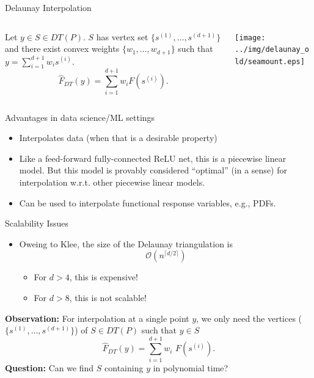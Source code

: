 \documentclass[aspectratio=169]{beamer}
\begin{document}
\begin{frame}{Delaunay Interpolation}
\begin{columns}
\begin{column}{.58\textwidth}
Let $y \in S \in DT(P)$.
$S$ has vertex set $\{s^{(1)}, \ldots, s^{(d+1)}\}$ and there exist
convex weights $\{w_1, \ldots, w_{d+1}\}$ such that
$y = \sum_{i=1}^{d+1} w_i s^{(i)}$.
$$
{\hat F}_{DT}(y) = \sum_{i=1}^{d+1} w_i F(s^{(i)}).
$$
\end{column}
\begin{column}{.38\textwidth}
\hbox{\texttt{[image: ../img/delaunay\_old/seamount.eps]}}
\end{column}
\end{columns}
\medskip
Advantages in data science/ML settings
\begin{itemize}
\item Interpolates data (when that is a desirable property)
\item Like a feed-forward fully-connected ReLU net, this is a piecewise linear
model.
But this model is provably considered ``optimal'' (in a sense) for
interpolation w.r.t. other piecewise linear models.
\item Can be used to interpolate functional response variables, e.g., PDFs.
\end{itemize}
\end{frame}
\begin{frame}{Scalability Issues}
\begin{itemize}
\item Oweing to Klee, the size of the Delaunay triangulation is
$$
\mathcal{O}\left(n^{\lceil d/2 \rceil}\right)
$$
\begin{itemize}
\item For $d > 4$, this is expensive!
\item For $d > 8$, this is not scalable!
\end{itemize}
\end{itemize}
\pause
{\textbf{Observation:}
For interpolation at a single point $y$, we only need the
vertices ($\{s^{(1)}, \ldots, s^{(d+1)}\}$) of $S \in DT(P)$
such that $y\in S$}
$$
{\hat F}_{DT}(y) = \sum_{i=1}^{d+1} w_i\text{~}F(s^{(i)}).
$$
\medskip
\pause
{\textbf{Question:} Can we find $S$ containing $y$ in polynomial time?}
\end{frame}

\end{document}
